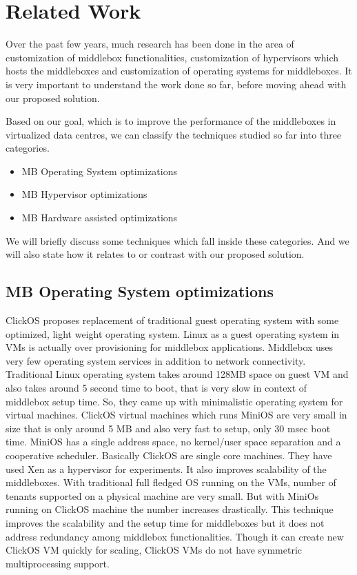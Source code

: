 \documentclass[a4paper,11pt]{report}
\begin{document}
\chapter{Related Work}
\noindent Over the past few years, much research has been done in the area of customization of middlebox functionalities, customization of hypervisors which hosts the middleboxes and customization of operating systems for middleboxes. It is very important to understand the work done so far, before moving ahead with our proposed solution.

Based on our goal, which is to improve the performance of the middleboxes in virtualized data centres, we can classify the techniques studied so far into three categories.
\begin{itemize}
\item MB Operating System optimizations
\item MB Hypervisor optimizations
\item MB Hardware assisted optimizations
\end{itemize}
We will briefly discuss some techniques which fall inside these categories. And we will also state how it relates to or contrast with our proposed solution.
\section{MB Operating System optimizations}
ClickOS\cite{R1} proposes replacement of traditional guest operating system with some optimized, light weight operating system. Linux as a guest operating system in VMs is actually over provisioning for middlebox applications. Middlebox uses very few operating system services in addition to network connectivity. Traditional Linux operating system takes around 128MB space on guest VM and also takes around 5 second time to boot, that is very slow in context of middlebox setup time. So, they came up with minimalistic operating system for virtual machines. ClickOS virtual machines which runs MiniOS are very small in size that is only around 5 MB and also very fast to setup, only 30 msec boot time. MiniOS has a single address space, no kernel/user space separation and a cooperative scheduler. Basically ClickOS are single core machines. They have used Xen as a hypervisor for experiments. It also improves scalability of the middleboxes. With traditional full fledged OS running on the VMs, number of tenants supported on a physical machine are very small. But with MiniOs running on ClickOS machine the number increases drastically. This technique improves the scalability and the setup time for middleboxes but it does not address redundancy among middlebox functionalities. Though it can create new ClickOS VM quickly for scaling, ClickOS VMs do not have symmetric multiprocessing support.             
\end{document}

